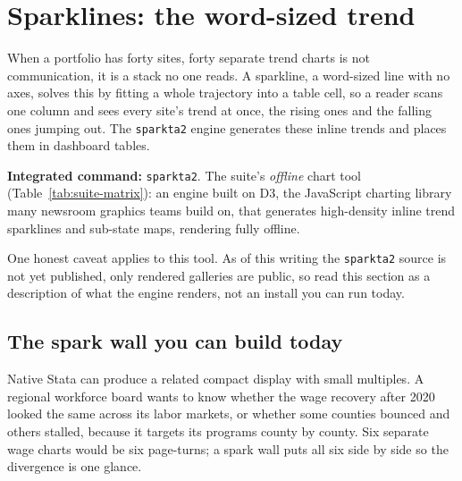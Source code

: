 \documentclass[
    a4paper,
    fontsize=10pt,
    twoside=true,
    numbers=noenddot,
]{kaobook}
\begin{document}
\section{Sparklines: the word-sized trend}
When a portfolio has forty sites, forty separate trend charts is not communication, it is a stack no one reads. A sparkline, a word-sized line with no axes, solves this by fitting a whole trajectory into a table cell, so a reader scans one column and sees every site's trend at once, the rising ones and the falling ones jumping out. The \texttt{sparkta2} engine generates these inline trends and places them in dashboard tables.

\begin{kaobox}[frametitle=Package Integration: \texttt{sparkta2}]
\textbf{Integrated command:} \texttt{sparkta2}. The suite's \emph{offline} chart tool (Table~\ref{tab:suite-matrix}): an engine built on D3, the JavaScript charting library many newsroom graphics teams build on, that generates high-density inline trend sparklines and sub-state maps, rendering fully offline.
\end{kaobox}

One honest caveat applies to this tool. As of this writing the \texttt{sparkta2} source is not yet published, only rendered galleries are public, so read this section as a description of what the engine renders, not an install you can run today.

\subsection{The spark wall you can build today}\label{sec:sparkwall}
Native Stata can produce a related compact display with small multiples. A regional workforce board wants to know whether the wage recovery after 2020 looked the same across its labor markets, or whether some counties bounced and others stalled, because it targets its programs county by county. Six separate wage charts would be six page-turns; a spark wall puts all six side by side so the divergence is one glance.
\end{document}
